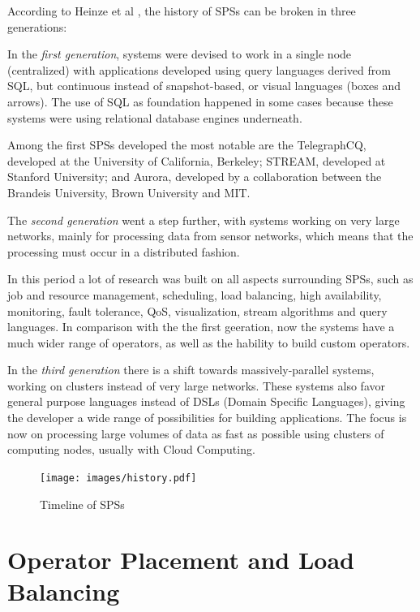 \documentclass[ppgc,diss,english]{iiufrgs}
\begin{document}

According to Heinze et al \cite{heinze2014cloud}, the history of SPSs can be broken in three generations:

In the \emph{first generation}, systems were devised to work in a single node (centralized) with applications developed using query languages derived from SQL, but continuous instead of snapshot-based, or visual languages (boxes and arrows). The use of SQL as foundation happened in some cases because these systems were using relational database engines underneath.

Among the first SPSs developed the most notable are the TelegraphCQ, developed at the University of California, Berkeley; STREAM, developed at Stanford University; and Aurora, developed by a collaboration between the Brandeis University, Brown University and MIT.

The \emph{second generation} went a step further, with systems working on very large networks, mainly for processing data from sensor networks, which means that the processing must occur in a distributed fashion.

In this period a lot of research was built on all aspects surrounding SPSs, such as job and resource management, scheduling, load balancing, high availability, monitoring, fault tolerance, QoS, visualization, stream algorithms and query languages. In comparison with the the first geeration, now the systems have a much wider range of operators, as well as the hability to build custom operators.

In the \emph{third generation} there is a shift towards massively-parallel systems, working on clusters instead of very large networks. These systems also favor general purpose languages instead of DSLs (Domain Specific Languages), giving the developer a wide range of possibilities for building applications. The focus is now on processing large volumes of data as fast as possible using clusters of computing nodes, usually with Cloud Computing.

\begin{figure}[!ht]
	\centering
	\texttt{[image: images/history.pdf]}
	\caption[Timeline of SPSs]{Timeline of SPSs \cite{heinze2014cloud}\cite{paulvincent2014}}
	\label{fig:sps_history}
\end{figure}


\section{Operator Placement and Load Balancing}
\label{sec:esp:scheduling_load_balancing}
\end{document}
